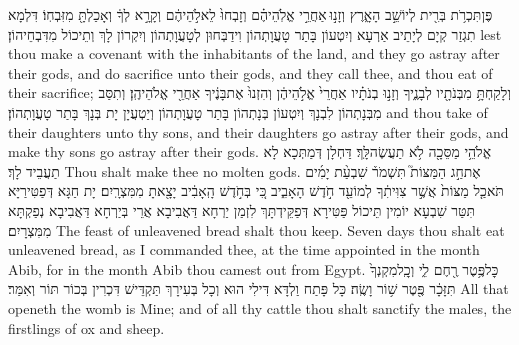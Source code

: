 {פֶּן\maqqaf תִּכְרֹ֥ת בְּרִ֖ית לְיוֹשֵׁ֣ב הָאָ֑רֶץ וְזָנ֣וּ \legarmeh  אַחֲרֵ֣י אֱלֹֽהֵיהֶ֗ם וְזָבְחוּ֙ לֵאלֹ֣הֵיהֶ֔ם וְקָרָ֣א לְךָ֔ וְאָכַלְתָּ֖ מִזִּבְחֽוֹ׃}
{דִּלְמָא תִגְזַר קְיָם לְיָתֵיב אַרְעָא וְיִטְעוֹן בָּתַר טָעֲוָתְהוֹן וִידַבְּחוּן לְטָעֲוָתְהוֹן וְיִקְרוֹן לָךְ וְתֵיכוֹל מִדִּבְחֵיהוֹן׃}
{lest thou make a covenant with the inhabitants of the land, and they go astray after their gods, and do sacrifice unto their gods, and they call thee, and thou eat of their sacrifice;}{}
{וְלָקַחְתָּ֥ מִבְּנֹתָ֖יו לְבָנֶ֑יךָ וְזָנ֣וּ בְנֹתָ֗יו אַחֲרֵי֙ אֱלֹ֣הֵיהֶ֔ן וְהִזְנוּ֙ אֶת\maqqaf בָּנֶ֔יךָ אַחֲרֵ֖י אֱלֹהֵיהֶֽן׃}
{וְתִסַּב מִבְּנָתְהוֹן לִבְנָךְ וְיִטְעוֹן בְּנָתְהוֹן בָּתַר טָעֲוָתְהוֹן וְיַטְעֲיָן יָת בְּנָךְ בָּתַר טָעֲוָתְהוֹן׃}
{and thou take of their daughters unto thy sons, and their daughters go astray after their gods, and make thy sons go astray after their gods.}{}
{אֱלֹהֵ֥י מַסֵּכָ֖ה לֹ֥א תַעֲשֶׂה\maqqaf לָּֽךְ׃}
{דַּחְלָן דְּמַתְּכָא לָא תַעֲבֵיד לָךְ׃}
{Thou shalt make thee no molten gods.}{}
{אֶת\maqqaf חַ֣ג הַמַּצּוֹת֮ תִּשְׁמֹר֒ שִׁבְעַ֨ת יָמִ֜ים תֹּאכַ֤ל מַצּוֹת֙ אֲשֶׁ֣ר צִוִּיתִ֔ךָ לְמוֹעֵ֖ד חֹ֣דֶשׁ הָאָבִ֑יב כִּ֚י בְּחֹ֣דֶשׁ הָֽאָבִ֔יב יָצָ֖אתָ מִמִּצְרָֽיִם׃}
{יָת חַגָּא דְּפַטִּירַיָּא תִּטַּר שִׁבְעָא יוֹמִין תֵּיכוֹל פַּטִּירָא דְּפַקֵּידְתָּךְ לִזְמַן יַרְחָא דַּאֲבִיבָא אֲרֵי בְּיַרְחָא דַּאֲבִיבָא נְפַקְתָּא מִמִּצְרָיִם׃}
{The feast of unleavened bread shalt thou keep. Seven days thou shalt eat unleavened bread, as I commanded thee, at the time appointed in the month Abib, for in the month Abib thou camest out from Egypt.}{}
{כׇּל\maqqaf פֶּ֥טֶר רֶ֖חֶם לִ֑י וְכׇֽל\maqqaf מִקְנְךָ֙ תִּזָּכָ֔ר פֶּ֖טֶר שׁ֥וֹר וָשֶֽׂה׃}
{כָּל פָּתַח וַלְדָּא דִּילִי הוּא וְכָל בְּעִירָךְ תַּקְדֵּישׁ דִּכְרִין בְּכוֹר תּוֹר וְאִמַּר׃}
{All that openeth the womb is Mine; and of all thy cattle thou shalt sanctify the males, the firstlings of ox and sheep.}{}
